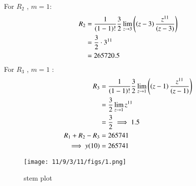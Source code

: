 \documentclass[journal,12pt,twocolumn]{IEEEtran}
\theoremstyle{remark}
\begin{document}
For $R_2$ , $m=1$:
\begin{align}
R_2 &=\frac{1}{\left(1-1\right)!}\frac{3}{2}\lim\limits_{z\to 3}\left(\left(z-3\right)\frac{z^{11}}{\left(z-3\right)}\right) \\
&=\frac{3}{2}\cdot{3^{11}}  \\
&=265720.5
\end{align}
For $R_3$ , $m=1$ :
\begin{align}
R_3 &=\frac{1}{\left(1-1\right)!}\frac{3}{2}\lim\limits_{z\to 1}\left(\left(z-1\right)\frac{z^{11}}{\left(z-1\right)}\right) \\
&=\frac{3}{2}\lim\limits_{z\to1}z^{11}\\
&=\frac{3}{2}  \implies 1.5\\
 R_1 + R_2 - R_3 &= 265741\\
    \implies  y{(10)} &= 265741
\end{align}
\begin{figure}[b]
    \centering
    \texttt{[image: 11/9/3/11/figs/1.png]}
    \caption{stem plot }
    \label{fig:1}
\end{figure}
\end{document}
